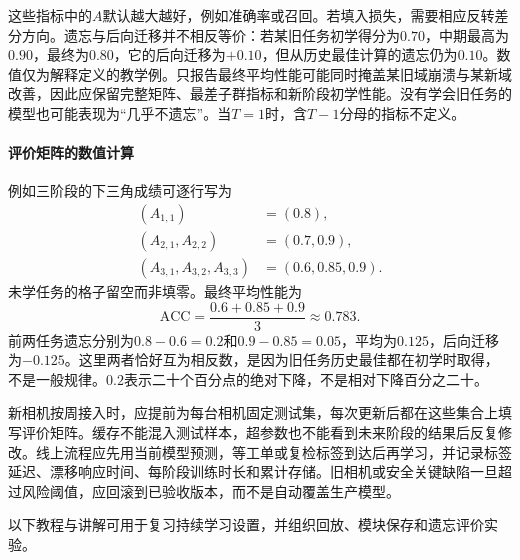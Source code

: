这些指标中的$A$默认越大越好，例如准确率或召回。若填入损失，需要相应反转差分方向。遗忘与后向迁移并不相反等价：若某旧任务初学得分为$0.70$，中期最高为$0.90$，最终为$0.80$，它的后向迁移为$+0.10$，但从历史最佳计算的遗忘仍为$0.10$。数值仅为解释定义的教学例。只报告最终平均性能可能同时掩盖某旧域崩溃与某新域改善，因此应保留完整矩阵、最差子群指标和新阶段初学性能。没有学会旧任务的模型也可能表现为“几乎不遗忘”。当$T=1$时，含$T-1$分母的指标不定义。

\paragraph{评价矩阵的数值计算}
例如三阶段的下三角成绩可逐行写为
\begin{align*}
 (A_{1,1})&=(0.8),\\
 (A_{2,1},A_{2,2})&=(0.7,0.9),\\
 (A_{3,1},A_{3,2},A_{3,3})&=(0.6,0.85,0.9).
\end{align*}
未学任务的格子留空而非填零。最终平均性能为
\begin{equation*}
 \mathrm{ACC}=\frac{0.6+0.85+0.9}{3}\approx0.783.
\end{equation*}
前两任务遗忘分别为$0.8-0.6=0.2$和$0.9-0.85=0.05$，平均为$0.125$，后向迁移为$-0.125$。这里两者恰好互为相反数，是因为旧任务历史最佳都在初学时取得，不是一般规律。$0.2$表示二十个百分点的绝对下降，不是相对下降百分之二十。

新相机按周接入时，应提前为每台相机固定测试集，每次更新后都在这些集合上填写评价矩阵。缓存不能混入测试样本，超参数也不能看到未来阶段的结果后反复修改。线上流程应先用当前模型预测，等工单或复检标签到达后再学习，并记录标签延迟、漂移响应时间、每阶段训练时长和累计存储。旧相机或安全关键缺陷一旦超过风险阈值，应回滚到已验收版本，而不是自动覆盖生产模型。

以下教程与讲解可用于复习持续学习设置，并组织回放、模块保存和遗忘评价实验。
